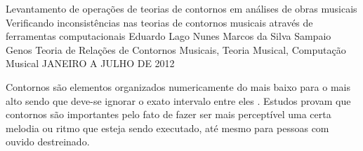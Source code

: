 \documentclass[11pt]{article}
\begin{document}
\graphicspath{{figs/}}


\dadosRelatorioFinal
{Levantamento de operações de teorias de contornos em análises de
  obras musicais}
{Verificando inconsistências nas teorias de contornos musicais através
  de ferramentas computacionais }
{Eduardo Lago Nunes}
{Marcos da Silva Sampaio}
{Genos}
{Teoria de Relações de Contornos Musicais, Teoria Musical, Computação Musical}
{JANEIRO A JULHO DE 2012}


\newpage

\setcounter{page}{1}
\onehalfspace






\label{sec:introducao}


Contornos são elementos organizados numericamente do mais baixo para
o mais alto sendo que deve-se ignorar o exato intervalo entre eles
\cite[p. 226]{Marvin1987}.
Estudos provam que contornos são importantes pelo fato de fazer ser
mais perceptível uma certa melodia ou ritmo que esteja sendo executado,
até mesmo para pessoas com ouvido destreinado.
\end{document}
